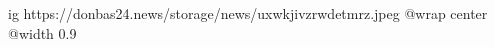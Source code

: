  
 
 
 
 

\ifcmt
  ig https://donbas24.news/storage/news/uxwkjivzrwdetmrz.jpeg
  @wrap center
  @width 0.9
\fi
